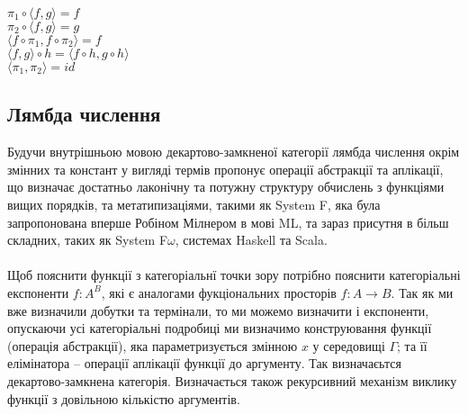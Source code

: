\documentclass[9pt]{memoir}
\begin{document}
\begin{center}
$\pi_1 \circ \langle f, g \rangle = f$\\
$\pi_2 \circ \langle f, g \rangle = g$\\
$\langle f \circ \pi_1, f \circ \pi_2 \rangle = f$\\
$\langle f, g \rangle \circ h = \langle f \circ h, g \circ h \rangle$\\
$\langle \pi_1, \pi_2 \rangle = id$\\
\end{center}

\newpage

    \subsection{Лямбда числення}
    Будучи внутрішньою мовою декартово-замкненої категорії лямбда числення окрім змінних
    та констант у вигляді термів пропонує операції абстракції та аплікації, що визначає
    достатньо лаконічну та потужну структуру обчислень з функціями вищих порядків,
    та метатипизаціями, такими як System F, яка була запропонована
    вперше Робіном Мілнером в мові ML, та зараз присутня в більш складних,
    таких як System F$\omega$, системах Haskell та Scala.

    \paragraph{}
    Щоб пояснити функції з категоріальнї точки зору потрібно пояснити категоріальні
    експоненти $f : A^B$,  які є аналогами фукціональних просторів $f: A \rightarrow B$.
    Так як ми вже визначили добутки та термінали, то ми можемо визначити і експоненти,
    опускаючи усі категоріальні подробиці ми визначимо конструювання функції (операція абстракції),
    яка параметризується змінною $x$ у середовищі $\Gamma$; та її елімінатора -- операції аплікації
    функції до аргументу. Так визначаєьтся декартово-замкнена категорія.
    Визначається також рекурсивний механізм виклику функції
    з довільною кількістю аргументів.
\end{document}
